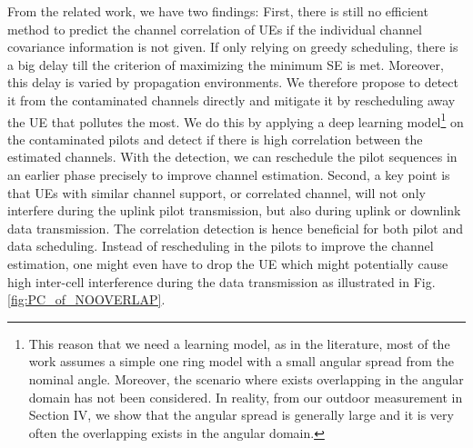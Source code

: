 From the related work, we have two findings: First, there is still no efficient method to predict %
the channel correlation of UEs %
if the individual channel covariance information is not given. If only relying on greedy scheduling, there is a big delay till the criterion of maximizing the minimum SE is met. Moreover, this delay is varied by propagation environments. 
We therefore propose %
to detect it from the contaminated channels directly and mitigate it by rescheduling away the UE that pollutes the most. We do this by applying a deep learning model\footnote{This reason that we need a learning model, as in the literature, most of the work assumes a simple one ring model with a small angular spread from the nominal angle. Moreover, the scenario where exists overlapping in the angular domain has not been considered. In reality, from our outdoor measurement in Section IV, we show that the angular spread is generally large and it is very often the overlapping exists in the angular domain.} on the contaminated pilots and detect if there is high correlation between the estimated channels. %
With the detection, we can reschedule the pilot sequences in an earlier phase precisely to improve channel estimation. %
Second, a key point is that UEs with similar channel support, or correlated channel, will not only interfere during the uplink pilot transmission, but also during uplink or downlink data transmission. The correlation detection is hence beneficial for both pilot and data scheduling.
Instead of rescheduling in the pilots to improve the channel estimation, one might even have to drop the UE which might potentially cause high inter-cell interference during the data transmission as illustrated in Fig. \ref{fig:PC_of_NOOVERLAP}.  %

